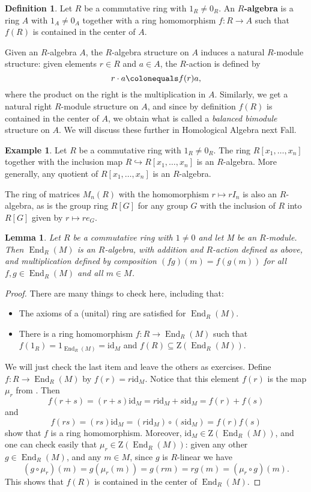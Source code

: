 \documentclass[12pt]{report}
\newtheorem{lemma}[theorem]{Lemma}
\numberwithin{equation}{section}
\numberwithin{theorem}{chapter}
\theoremstyle{definition}
\newtheorem{definition}[theorem]{Definition}
\newtheorem{example}[theorem]{Example}
\newtheorem*{basic properties}{Basic Properties}
\newtheorem*{Important Remark}{Important Remark}
\newcommand{\df}[1]{{\bf #1}\index{#1}}
\DeclareMathOperator{\End}{End}
\begin{document}
\begin{definition}
	Let $R$ be a commutative ring with $1_R \neq 0_R$. An \df{$R$-algebra} is a ring $A$ with $1_A \neq 0_A$ together with a ring homomorphism $f\!: R \to A$ such that $f(R)$ is contained in the center of $A$.
\end{definition}


Given an $R$-algebra $A$, the $R$-algebra structure on $A$ induces a natural $R$-module structure: given elements $r \in R$ and $a \in A$, the $R$-action is defined by 
$$r \cdot a \colonequals f(r) a,$$
where the product on the right is the multiplication in $A$. Similarly, we get a natural right $R$-module structure on $A$, and since by definition $f(R)$ is contained in the center of $A$, we obtain what is called a \emph{balanced bimodule} structure on $A$. We will discuss these further in Homological Algebra next Fall.


\begin{example}
Let $R$ be a commutative ring with $1_R \neq 0_R$. The ring $R[x_1,\ldots, x_n]$ together with the inclusion map $R \hookrightarrow R[x_1,\ldots, x_n]$ is an $R$-algebra. More generally, any quotient of $R[x_1,\ldots, x_n]$ is an $R$-algebra.

The ring of matrices $M_n(R)$ with the homomorphism $r \mapsto r I_n$ is also an $R$-algebra, as is the group ring $R[G]$ for any group $G$ with the inclusion of $R$ into $R[G]$ given by $r \mapsto r e_G$.
\end{example}



\begin{lemma}
 Let $R$ be a commutative ring with $1 \neq 0$ and let M be an $R$-module. Then $\End_R(M)$ is an $R$-algebra, with addition and $R$-action defined as above, and multiplication defined by composition $(fg)(m) = f(g(m))$ for all $f,g \in \End_R(M)$ and all $m \in M$.
\end{lemma}

\begin{proof}
There are many things to check here, including that:
\begin{itemize}
\item The axioms of a (unital) ring are satisfied for $\End_R(M)$.
\item There is a ring homomorphism $f\!:R\to \End_R(M)$ such that $f(1_R)=1_{\End_R(M)}=\mathrm{id}_M$ and $f(R)\subseteq \mathrm{Z}(\End_R(M))$.
\end{itemize}
We will just check the last item and leave the others as exercises. Define $f\!:R\to \End_R(M)$ by $f(r)=r\mathrm{id}_M$. Notice that this element $f(r)$ is the map $\mu_r$ from . Then
$$f(r+s)=(r+s)\mathrm{id}_M=r\mathrm{id}_M+s\mathrm{id}_M=f(r)+f(s)$$ 
and 
$$f(rs)=(rs)\mathrm{id}_M=(r\mathrm{id}_M)\circ(s\mathrm{id}_M)=f(r)f(s)$$
 show that $f$ is a ring homomorphism. Moreover, $\mathrm{id}_M\in \mathrm{Z}(\End_R(M))$, and one can check easily that $\mu_r \in \mathrm{Z}(\End_R(M))$: given any other $g \in \End_R(M)$, and any $m \in M$, since $g$ is $R$-linear we have
$$(g \circ \mu_r)(m) = g(\mu_r(m)) = g(rm) = rg(m) = (\mu_r \circ g) (m).$$ 
This shows that $f(R)$ is contained in the center of $\End_R(M)$.
\end{proof}
\end{document}
